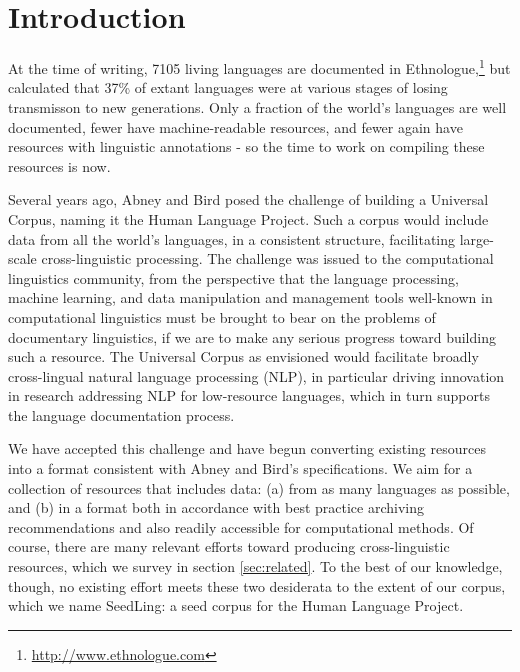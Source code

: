 \section{Introduction} \label{sec:intro}

At the time of writing, 7105 living languages are documented in Ethnologue,\footnote{\url{http://www.ethnologue.com}} but  calculated that 37\% of extant languages were at various stages of losing transmisson to new generations. Only a fraction of the world's languages are well documented, fewer have machine-readable resources, and fewer again have resources with linguistic annotations \cite{maxwell2006annotation} - so the time to work on compiling these resources is now.

Several years ago, Abney and Bird  posed the challenge of building a Universal Corpus, naming it the Human Language Project. Such a corpus would include data from all the world's languages, in a consistent structure, facilitating large-scale cross-linguistic processing. The challenge was issued to the computational linguistics community, from the perspective that the language processing, machine learning, and data manipulation and management tools well-known in computational linguistics must be brought to bear on the problems of documentary linguistics, if we are to make any serious progress toward building such a resource. The Universal Corpus as envisioned would facilitate broadly cross-lingual natural language processing (NLP), in particular driving innovation in research addressing NLP for low-resource languages, which in turn supports the language documentation process. 

We have accepted this challenge and have begun converting existing resources into a format consistent with Abney and Bird's specifications. We aim for a collection of resources that includes data: (a) from as many languages as possible, and (b) in a format both in accordance with best practice archiving recommendations and also readily accessible for computational methods. Of course, there are many relevant efforts toward producing cross-linguistic resources, which we survey in section \ref{sec:related}. To the best of our knowledge, though, no existing effort meets these two desiderata to the extent of our corpus, which we name SeedLing: a seed corpus for the Human Language Project.

